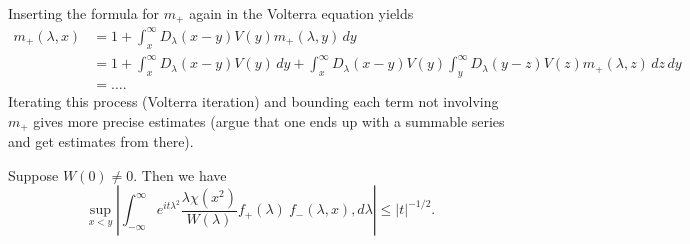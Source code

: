 \begin{remark}
  Inserting the formula for $m_+$ again in the
  Volterra equation yields
  \begin{align*}
    m_+(\lambda, x)
    &= 1 + \int_x^\infty D_\lambda(x - y) V(y) m_+(\lambda, y)\, dy \\
    &= 1 + \int_x^\infty D_\lambda(x - y) V(y) \, dy
    + \int_x^\infty D_\lambda(x - y) V(y) \int_y^\infty D_\lambda(y - z) V(z) m_+(\lambda, z)\, dz\, dy \\
    &= \dots.
  \end{align*}
  Iterating this process (Volterra iteration) and
  bounding each term not
  involving $m_+$ gives more precise estimates (argue
  that one ends up with a summable series and get
  estimates from there).
\end{remark}

\begin{lemma}
  Suppose $W(0) \ne 0$. Then we have
  \[
    \sup_{x < y} \left|\int_{-\infty}^\infty e^{it\lambda^2} \frac{\lambda \chi(x^2)}{W(\lambda)} f_+(\lambda)\ f_-(\lambda, x), d\lambda\right|
    \le |t|^{-1 / 2}.
  \]
\end{lemma}
